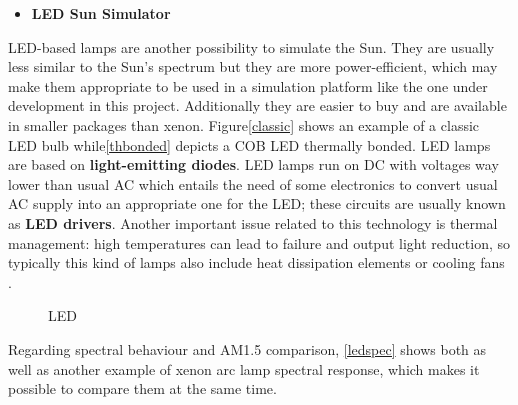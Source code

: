	
	
	\newpage
	\begin{itemize} [noitemsep,topsep=0pt]
			 \item \textbf{LED Sun Simulator}
	\end{itemize}

	\acrshort{LED}-based lamps are another possibility to simulate the Sun. They are usually less similar to the Sun's spectrum but they are more power-efficient, which may make them appropriate to be used in a simulation platform like the one under development in this project. Additionally they are easier to buy and are available in smaller packages than xenon. Figure\autoref{classic} shows an example of a classic \acrshort{LED} bulb while\autoref{thbonded} depicts a \acrshort{COB} \acrshort{LED} thermally bonded. \acrshort{LED} lamps are based on \textbf{light-emitting diodes}. \acrshort{LED} lamps run on \acrshort{DC} with voltages way lower than usual \acrshort{AC} which entails the need of some electronics to convert usual \acrshort{AC} supply into an appropriate one for the \acrshort{LED}; these circuits are usually known as \textbf{\acrshort{LED} drivers}. Another important issue related to this technology is thermal management: high temperatures can lead to failure and output light reduction, so typically this kind of lamps also include heat dissipation elements or cooling fans \cite{wiki}. 
	
				\begin{figure}[H]
			\centering
			 \quad
			\caption{\acrshort{LED} \cite{wiki}} 
		\vspace{-0.5cm}
\end{figure}	
	
	Regarding spectral behaviour and \acrshort{AM}1.5 comparison, \autoref{ledspec} shows both as well as another example of xenon arc lamp spectral response, which makes it possible to compare them at the same time.
	
